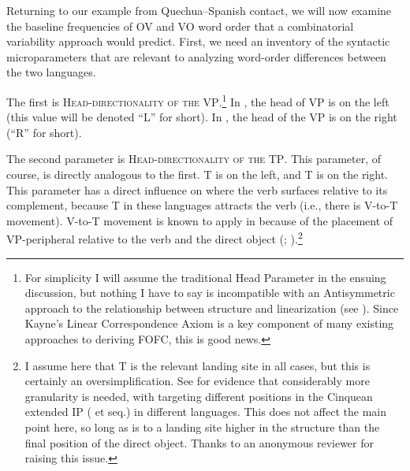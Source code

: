 \documentclass[output=paper]{langsci/langscibook}
\begin{document}
Returning to our example from Quechua--Spanish contact, we will now examine the
baseline frequencies of OV and VO word order that a combinatorial variability
approach would predict.  First, we need an inventory of the syntactic
microparameters that are relevant to analyzing word-order differences between
the two languages.%

The first is \textsc{Head-directionality of the VP}.\footnote{For simplicity I
    will assume the traditional Head Parameter in the ensuing discussion, but
    nothing I have to say is incompatible with an Antisymmetric approach to the
    relationship between structure and linearization (see \citealt{Kayne1994}).
Since Kayne’s Linear Correspondence Axiom is a key component of many existing
approaches to deriving FOFC, this is good news.}  In , the head of VP is
on the left (this value will be denoted \enquote{L} for short).   In , the head
of the VP is on the right (\enquote{R} for short).

The second parameter is \textsc{Head-directionality of the TP}.  This
parameter, of course, is directly analogous to the first.   T is on the
left, and  T is on the right.  This parameter has a direct influence on
where the verb surfaces relative to its complement, because T in these
languages attracts the verb (i.e., there is V-to-T movement).  V-to-T movement
is known to apply in  because of the placement of VP-peripheral 
relative to the verb and the direct object (\citealt{Pollock1989};
\citealt{Zagona2002}).\footnote{I assume here that T is the relevant landing
    site in all cases, but this is certainly an oversimplification.  See
    \textcite{Schifano2015,Schifano2018} for evidence that considerably more
    granularity is needed, with  targeting different positions in
    the Cinquean extended IP (\citealt{Cinque1999} et seq.) in different
    languages.  This does not affect the main point here, so long as
     is to a landing site higher in the structure than the final position
of the direct object.  Thanks to an anonymous reviewer for raising this
issue.}
\end{document}
